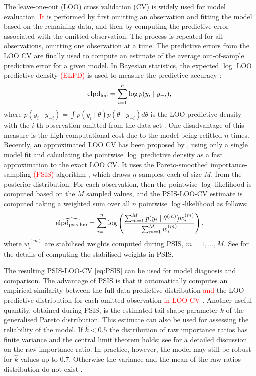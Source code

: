 \documentclass[a4paper]{article}   	%
\newcommand{\elpd}{elpd\textsubscript{loo}}
\newcommand{\psis}{elpd\textsubscript{psis-loo}}
\begin{document}
	The leave-one-out (LOO) cross validation (CV) is widely used for model evaluation. \textcolor{red}{It} is performed by first omitting an observation and fitting the model based on the remaining data, and then by computing the predictive error associated with the omitted observation. The process is repeated for all observations, omitting one observation at a time. The predictive errors from the LOO CV are finally used to compute an estimate of the average out-of-sample predictive error for a given model. In Bayesian statistics, the expected $\log$ LOO predictive density \textcolor{red}{(ELPD)} is used to measure the predictive accuracy : 
	\begin{equation}\label{eq:elpd}
		\mbox{\elpd} = \sum_{i=1}^{n}\log p(y_i\mid y_{-i}),
	\end{equation}
	where $p(y_i \mid y_{-i}) = \int p(y_i \mid \theta)p(\theta \mid y_{-i})d\theta$ is the LOO predictive density with the $i$-th observation omitted from the data set \parencite{Vehtari2017Practical}. One disadvantage of this measure is the high computational cost due to the model being refitted $n$ times. Recently, an approximated LOO CV has been proposed by \textcite{Burkner2021Efficient}, using only a single model fit and calculating the pointwise $\log$ predictive density as a fast approximation to the exact LOO CV. It uses the Pareto-smoothed importance-sampling \textcolor{red}{(PSIS)} algorithm \parencite{Vehtari2017Practical}, which draws $n$ samples, each of size $M$, from the posterior distribution. For each observation, then the pointwise $\log$-likelihood is computed based on the $M$ sampled values, and  the PSIS-LOO-CV estimate is computed taking a weighted sum over all $n$ pointwise $\log$-likelihood as follows:
	\begin{equation}\label{eq:PSIS}
		\widehat{\mbox{\psis}} = \sum_{i=1}^n\log\left(  \frac{ \sum_{m=1}^{M} p(y_i\mid \theta^{(m)})w_i^{(m)} }{ \sum_{m=1}^{M}w_i^{(m)} }\right), 
	\end{equation}
	where $w_i^{(m)}$ are stabilised weights computed during PSIS, $m = 1, \ldots, M$. See \textcite{Vehtari2017Practical} for the details of computing the stabilised weights in PSIS.
	
	
	
	The resulting PSIS-LOO-CV \eqref{eq:PSIS} can be used for model diagnosis and comparison. The advantage of PSIS is that it automatically computes an empirical similarity between the full data predictive distribution \textcolor{red}{and} the LOO predictive distribution for each omitted observation \textcolor{red}{in LOO CV} \parencite{gabry2019Visualization}. Another useful quantity, obtained during PSIS, is the estimated tail shape parameter $\hat{k}$ of the generalised Pareto distribution. This estimate can also be used for assessing the reliability of the model. If $\hat{k}<0.5$ the distribution of raw importance ratios has finite variance and the central limit theorem holds; see \textcite{Vehtari2017Practical} for a detailed discussion on the raw importance ratio. In practice, however, the model may still be robust for $\hat{k}$ values up to 0.7. Otherwise the variance and the mean of the raw ratios distribution do not exist \parencite{Vehtari2017Practical}. 
	
\end{document}

